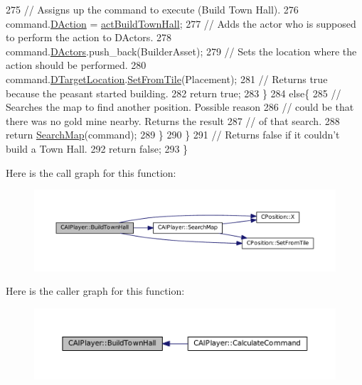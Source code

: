 \begin{DoxyCode}
275             \textcolor{comment}{// Assigns up the command to execute (Build Town Hall).}
276             command.\hyperlink{structSPlayerCommandRequest_a80897bbccf2c4e0b148a7aa815a926c6}{DAction} = \hyperlink{GameDataTypes_8h_a35b98ce26aca678b03c6f9f76e4778cea0b5f001e8c77b8a87998da6320595498}{actBuildTownHall};
277             \textcolor{comment}{// Adds the actor who is supposed to perform the action to DActors.}
278             command.\hyperlink{structSPlayerCommandRequest_aa37fc01519676345703d78b9f573894a}{DActors}.push\_back(BuilderAsset);
279             \textcolor{comment}{// Sets the location where the action should be performed.}
280             command.\hyperlink{structSPlayerCommandRequest_a701702b94ca2fd2738e95ef6711dd41a}{DTargetLocation}.\hyperlink{classCPosition_a46994e6a8b8e3b4237edd7259ad844b6}{SetFromTile}(Placement);
281             \textcolor{comment}{// Returns true because the peasant started building.}
282             \textcolor{keywordflow}{return} \textcolor{keyword}{true};
283         \}
284         \textcolor{keywordflow}{else}\{
285             \textcolor{comment}{// Searches the map to find another position. Possible reason}
286             \textcolor{comment}{// could be that there was no gold mine nearby. Returns the result}
287             \textcolor{comment}{// of that search.}
288             \textcolor{keywordflow}{return} \hyperlink{classCAIPlayer_afafbe8fc589e09a16ae1f02f2794d7b0}{SearchMap}(command);  
289         \}
290     \}
291     \textcolor{comment}{// Returns false if it couldn't build a Town Hall.}
292     \textcolor{keywordflow}{return} \textcolor{keyword}{false};
293 \}
\end{DoxyCode}
Here is the call graph for this function\+:\nopagebreak
\begin{figure}[H]
\begin{center}
\leavevmode
\includegraphics[width=350pt]{classCAIPlayer_a41cdefbe14210fb70b793a32778c5141_cgraph}
\end{center}
\end{figure}
Here is the caller graph for this function\+:\nopagebreak
\begin{figure}[H]
\begin{center}
\leavevmode
\includegraphics[width=350pt]{classCAIPlayer_a41cdefbe14210fb70b793a32778c5141_icgraph}
\end{center}
\end{figure}
